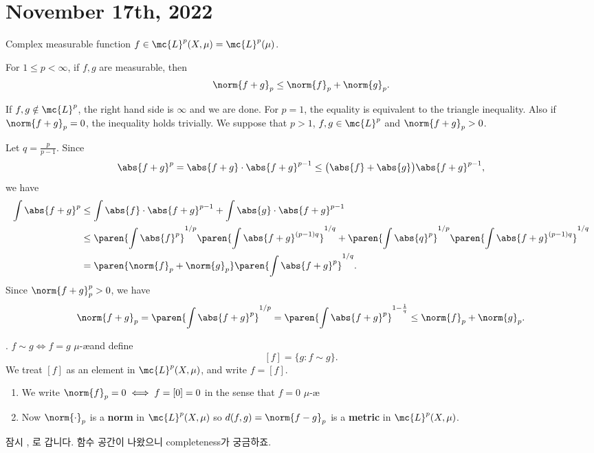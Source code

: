 \section*{November 17th, 2022}

Complex measurable function \(f \in \mc{L}^p(X, \mu) = \mc{L}^p(\mu)\).

  For \(1 \leq p < \infty\), if \(f, g\) are measurable, then
\[
    \norm{f + g}_p \leq \norm{f}_p + \norm{g}_p.
\]

\pf If \(f, g \notin \mc{L}^{p}\), the right hand side is \(\infty\) and we are done. For \(p = 1\), the equality is equivalent to the triangle inequality. Also if \(\norm{f + g}_p = 0\), the inequality holds trivially. We suppose that \(p > 1\), \(f, g \in \mc{L}^p\) and \(\norm{f+g}_p > 0\).

Let \(q = \frac{p}{p-1}\). Since
\[
    \abs{f + g}^p = \abs{f + g}\cdot \abs{f + g}^{p - 1} \leq \bigl(\abs{f} + \abs{g}\bigr) \abs{f + g}^{p-1},
\]
we have
\[
    \begin{aligned}
        \int \abs{f+g}^p & \leq \int \abs{f} \cdot \abs{f+g}^{p-1} + \int \abs{g} \cdot \abs{f+g}^{p-1}                                                                 \\
                         & \leq \paren{\int \abs{f}^p }^{1/p}\paren{\int \abs{f+g}^{(p-1)q}}^{1/q} + \paren{\int \abs{q}^p }^{1/p}\paren{\int \abs{f+g}^{(p-1)q}}^{1/q} \\
                         & = \paren{\norm{f}_p + \norm{g}_p} \paren{\int \abs{f+g}^p}^{1/q}.
    \end{aligned}
\]
Since \(\norm{f + g}_p^p > 0\), we have
\[
    \norm{f + g}_p = \paren{\int \abs{f+g}^p}^{1/p} = \paren{\int \abs{f+g}^p}^{1 - \frac{1}{q}} \leq \norm{f}_p + \norm{g}_p.
\]

. \(f \sim g \iff f = g\) \(\mu\)-\ae and define
\[
    [f] = \{g : f \sim g\}.
\]
We treat \([f]\) as an element in \(\mc{L}^{p}(X, \mu)\), and write \(f = [f]\).

\rmk
\begin{enumerate}
    \item We write \(\norm{f}_p = 0 \iff f = [0] = 0\) in the sense that \(f = 0\) \(\mu\)-\ae
    \item Now \(\norm{\cdot}_p\) is a \textbf{norm} in \(\mc{L}^{p}(X, \mu)\) so \(d(f, g) = \norm{f - g}_p\) is a \textbf{metric} in \(\mc{L}^{p}(X, \mu)\).
\end{enumerate}

잠시 {}, {}로 갑니다. 함수 공간이 나왔으니 completeness가 궁금하죠.

